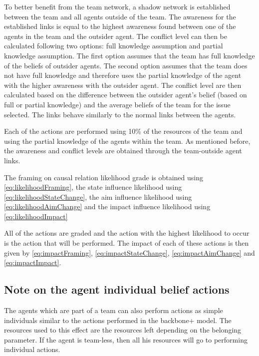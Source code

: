 \begin{itemize}
To better benefit from the team network, a shadow network is established between the team and all agents outside of the team. The awareness for the established links is equal to the highest awareness found between one of the agents in the team and the outsider agent. The conflict level can then be calculated following two options: full knowledge assumption and partial knowledge assumption. The first option assumes that the team has full knowledge of the beliefs of outsider agents. The second option assumes that the team does not have full knowledge and therefore uses the partial knowledge of the agent with the higher awareness with the outsider agent. The conflict level are then calculated based on the difference between the outsider agent’s belief (based on full or partial knowledge) and the average beliefs of the team for the issue selected. The links behave similarly to the normal links between the agents.

Each of the actions are performed using 10\% of the resources of the team and using the partial knowledge of the agents within the team. As mentioned before, the awareness and conflict levels are obtained through the team-outside agent links.


The framing on causal relation likelihood grade is obtained using \autoref{eq:likelihoodFraming}, the state influence likelihood using \autoref{eq:likelihoodStateChange}, the aim influence likelihood using \autoref{eq:likelihoodAimChange} and the impact influence likelihood using \autoref{eq:likelihoodImpact}

All of the actions are graded and the action with the highest likelihood to occur is the action that will be performed. The impact of each of these actions is then given by \autoref{eq:impactFraming}, \autoref{eq:impactStateChange}, \autoref{eq:impactAimChange} and \autoref{eq:impactImpact}.

\end{itemize}

\subsection{Note on the agent individual belief actions}

The agents which are part of a team can also perform actions as simple individuals similar to the actions performed in the backbone+ model. The resources used to this effect are the resources left depending on the belonging parameter. If the agent is team-less, then all his resources will go to performing individual actions.


